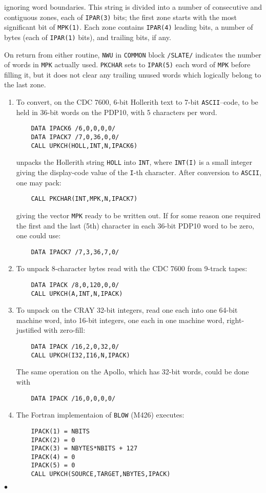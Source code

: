 ignoring word boundaries.
This string is divided into a number of consecutive and contiguous zones,
each of {\tt IPAR(3)} bits;
the first zone starts with the most significant bit of {\tt MPK(1)}.
Each zone contains {\tt IPAR(4)} leading bits,
a number of bytes (each of {\tt IPAR(1)} bits), and trailing bits, if any.
\par
On return from either routine, {\tt NWU} in {\tt COMMON} block
{\tt /SLATE/} indicates the number of words in {\tt MPK} actually used.
{\tt PKCHAR} sets to {\tt IPAR(5)} each word of {\tt MPK} before
filling it, but it does not clear any trailing unused words which
logically belong to the last zone.
\newpage
\Examples
\begin{enumerate}
\item To convert, on the CDC 7600, 6-bit Hollerith text to 7-bit
{\tt ASCII}--code, to be held in 36-bit words on the PDP10,
with 5 characters per word.
\begin{verbatim}
    DATA IPACK6 /6,0,0,0,0/
    DATA IPACK7 /7,0,36,0,0/
    CALL UPKCH(HOLL,INT,N,IPACK6)
\end{verbatim}
unpacks the Hollerith string {\tt HOLL} into {\tt INT}, where
{\tt INT(I)} is a small integer giving the display-code value of the
{\tt I}-th character. After conversion to {\tt ASCII}, one may pack:
\begin{verbatim}
    CALL PKCHAR(INT,MPK,N,IPACK7)
\end{verbatim}
giving the vector {\tt MPK} ready to be written out.
If for some reason one required the first and the last (5th)
character in each 36-bit PDP10 word to be zero, one could use:
\begin{verbatim}
    DATA IPACK7 /7,3,36,7,0/
\end{verbatim}
\item To unpack 8-character bytes read with the CDC 7600 from
9-track tapes:
\begin{verbatim}
    DATA IPACK /8,0,120,0,0/
    CALL UPKCH(A,INT,N,IPACK)
\end{verbatim}
\item To unpack on the CRAY 32-bit integers,
read one each into one 64-bit machine word,
into 16-bit integers, one each in one machine word,
right-justified with zero-fill:
\begin{verbatim}
    DATA IPACK /16,2,0,32,0/
    CALL UPKCH(I32,I16,N,IPACK)
\end{verbatim}
The same operation on the Apollo, which has 32-bit words,
could be done with
\begin{verbatim}
    DATA IPACK /16,0,0,0,0/
\end{verbatim}
\item The Fortran implementaion of {\tt BLOW} (M426) executes:
\begin{verbatim}
    IPACK(1) = NBITS
    IPACK(2) = 0
    IPACK(3) = NBYTES*NBITS + 127
    IPACK(4) = 0
    IPACK(5) = 0
    CALL UPKCH(SOURCE,TARGET,NBYTES,IPACK)
\end{verbatim}
\end{enumerate}
$\bullet$

